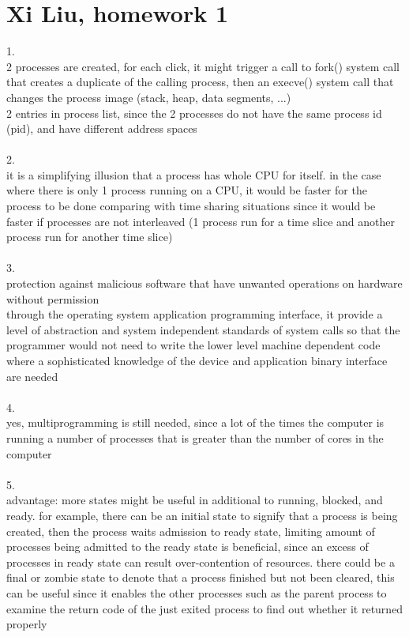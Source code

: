 \documentclass[12pt, border = 4pt, multi]{article} %
\begin{document}
\section*{Xi Liu, homework 1}
1.\\
2 processes are created, for each click, it might trigger a call to fork() system call that creates a duplicate of the calling process, then an execve() system call that changes the process image (stack, heap, data segments, ...)\\
2 entries in process list, since the 2 processes do not have the same process id (pid), and have different address spaces\\
\\
2.\\
it is a simplifying illusion that a process has whole CPU for itself. in the case where there is only 1 process running on a CPU, it would be faster for the process to be done comparing with time sharing situations since it would be faster if processes are not interleaved (1 process run for a time slice and another process run for another time slice)\\
\\
3.\\
protection against malicious software that have unwanted operations on hardware without permission\\
through the operating system application programming interface, it provide a level of abstraction and system independent standards of system calls so that the programmer would not need to write the lower level machine dependent code where a sophisticated knowledge of the device and application binary interface are needed\\
\\
4.\\
yes, multiprogramming is still needed, since a lot of the times the computer is running a number of processes that is greater than the number of cores in the computer\\
\\
5.\\
advantage: more states might be useful in additional to running, blocked, and ready. for example, there can be an initial state to signify that a process is being created, then the process waits admission to ready state, limiting amount of processes being admitted to the ready state is beneficial, since an excess of processes in ready state can result over-contention of resources. there could be a final or zombie state to denote that a process finished but not been cleared, this can be useful since it enables the other processes such as the parent process to examine the return code of the just exited process to find out whether it returned properly\\
\end{document}
